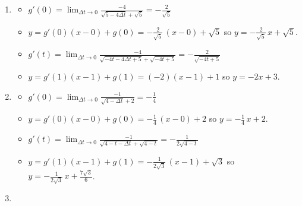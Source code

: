 \documentclass{ximera}
\begin{document}
\begin{enumerate}
\setcounter{enumi}{\value{HW}}

\item \begin{itemize}

\item  $g'(0) = \lim_{\Delta t \rightarrow 0} \frac{-4}{\sqrt{5-4\Delta t} + \sqrt{5}}  = - \frac{2}{\sqrt{5}}$

\smallskip

\item  $y = g'(0) (x - 0) + g(0) =  -\frac{2}{\sqrt{5}} \, (x-0) + \sqrt{5}$ so $y = -\frac{2}{\sqrt{5}} \, x + \sqrt{5}$.

\smallskip

\item  $g'(t) = \lim_{\Delta t \rightarrow 0} \frac{-4}{\sqrt{-4t-4\Delta t+5} + \sqrt{-4t+5}} =   -\frac{2}{\sqrt{-4t+5}}$

\smallskip

\item  $y = g'(1)(x-1)+g(1) = (-2)(x-1) + 1$ so $y = -2x+3$.

\smallskip

\end{itemize}

\item   \begin{itemize}

\item  $g'(0) = \lim_{\Delta t \rightarrow 0} \frac{-1}{\sqrt{4-\Delta t} + 2}  = - \frac{1}{4}$

\smallskip

\item  $y = g'(0) (x - 0) + g(0) =  -\frac{1}{4} \, (x-0) + 2$ so $y = -\frac{1}{4} \, x +2$.

\smallskip

\item  $g'(t) = \lim_{\Delta t \rightarrow 0} \frac{-1}{\sqrt{4-t-\Delta t} + \sqrt{4-t}} = -\frac{1}{2 \sqrt{4-t}} $  

\smallskip

\item  $y = g'(1)(x-1)+g(1) = -\frac{1}{2 \sqrt{3}} \, (x-1) + \sqrt{3}$ so $y =  -\frac{1}{2 \sqrt{3}}  \, x + \frac{7 \sqrt{3}}{6}$.

\smallskip

\end{itemize}


\item   \begin{enumerate}


\end{enumerate}
\end{enumerate}
\end{document}
